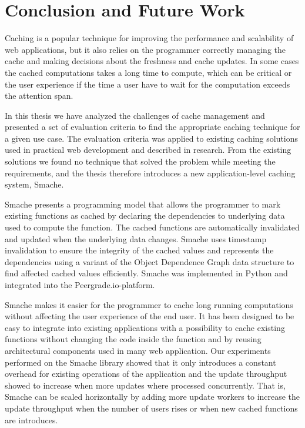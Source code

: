 \chapter{Conclusion and Future Work}
\label{chapter:conclusion}

Caching is a popular technique for improving the performance and scalability of web applications, but it also relies on the programmer correctly managing the cache and making decisions about the freshness and cache updates. In some cases the cached computations takes a long time to compute, which can be critical or the user experience if the time a user have to wait for the computation exceeds the attention span.

In this thesis we have analyzed the challenges of cache management and presented a set of evaluation criteria to find the appropriate caching technique for a given use case. The evaluation criteria was applied to existing caching solutions used in practical web development and described in research. From the existing solutions we found no technique that solved the problem while meeting the requirements, and the thesis therefore introduces a new application-level caching system, Smache.

Smache presents a programming model that allows the programmer to mark existing functions as cached by declaring the dependencies to underlying data used to compute the function. The cached functions are automatically invalidated and updated when the underlying data changes. Smache uses timestamp invalidation to ensure the integrity of the cached values and represents the dependencies using a variant of the Object Dependence Graph data structure to find affected cached values efficiently. Smache was implemented in Python and integrated into the Peergrade.io-platform.

Smache makes it easier for the programmer to cache long running computations without affecting the user experience of the end user. It has been designed to be easy to integrate into existing applications with a possibility to cache existing functions without changing the code inside the function and by reusing architectural components used in many web application. Our experiments performed on the Smache library showed that it only introduces a constant overhead for existing operations of the application and the update throughput showed to increase when more updates where processed concurrently. That is, Smache can be scaled horizontally by adding more update workers to increase the update throughput when the number of users rises or when new cached functions are introduces.

